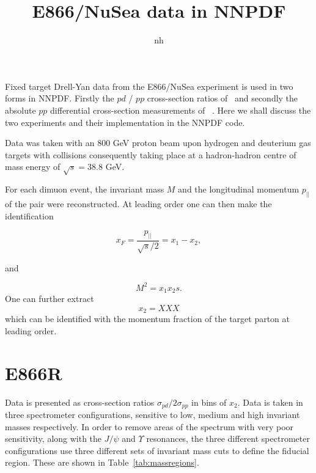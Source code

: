 \documentclass[11pt]{article}
\title{E866/NuSea data in NNPDF}
\author{nh}
\newcommand{\be}{\begin{equation}}
\newcommand{\ee}{\end{equation}}
\begin{document}
\maketitle
Fixed target Drell-Yan data from the E866/NuSea experiment is used in two forms in NNPDF.
Firstly the $pd$ / $pp$ cross-section ratios of~\cite{Towell:2001nh} and secondly the absolute
$pp$ differential cross-section measurements of ~\cite{Webb:2003ps}. Here we shall discuss the
two experiments and their implementation in the NNPDF code.

Data was taken with an 800 GeV proton beam upon hydrogen and deuterium gas targets with collisions
consequently taking place at a hadron-hadron centre of mass energy of $\sqrt{s}=38.8$ GeV.

For each dimuon event, the invariant mass $M$ and the longitudinal momentum $p_{||}$ of the pair
were reconstructed. At leading order one can then make the identification

\be x_F = \frac{p_{||}}{\sqrt{s}/2} = x_1 - x_2, \ee

and

\be M^2 = x_1x_2s. \ee
One can further extract
\be x_2 = XXX\ee
which can be identified with the momentum fraction of the target parton at leading order.
\section{E866R}
Data is presented as cross-section ratios $\sigma_{pd}/2\sigma_{pp}$ in bins of $x_2$.
Data is taken in three spectrometer configurations, sensitive to low, medium and high invariant
masses respectively. In order to remove areas of the spectrum with very poor sensitivity, along with the $J/\psi$ and $\Upsilon$ resonances,
the three different spectrometer configurations use three different sets of invariant mass cuts to define the fiducial region. These are shown
in Table~\ref{tab:massregions}.
\end{document}
